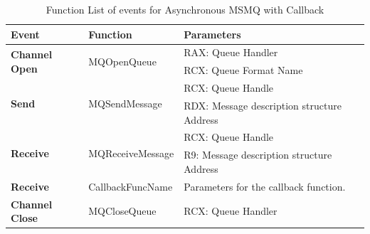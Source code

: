     \begin{table}[H]
        \centering
        \caption{Function List of events for Asynchronous MSMQ with Callback}
        \label{msmqasynfunctionscallback}
        \begin{tabular}{|l|l|l|}
            \hline
             \textbf{Event} & \textbf{Function}& \textbf{Parameters}  \\
             \hline
             \multirow{2}{*}{{\textbf{Channel Open}}}
             &\multirow{2}{*}{{MQOpenQueue}} &  RAX: Queue Handler\\
              \cline{3-3} 
             & &  RCX: Queue Format Name\\
            \hline
             \multirow{2}{*}{\textbf{Send}}
             &\multirow{2}{*}{MQSendMessage} &  RCX: Queue Handle \\
              \cline{3-3} 
             &&  RDX: Message description structure Address \\
            \hline
             \multirow{2}{*}{\textbf{Receive}}
             & \multirow{2}{*}{MQReceiveMessage}&  RCX: Queue Handle \\
              \cline{3-3} 
              &&  R9: Message description structure Address \\
             \hline
             \textbf{Receive}
              &CallbackFuncName&  Parameters for the callback function. \\
            \hline
            \textbf{Channel Close} &MQCloseQueue & RCX: Queue Handler \\
            \hline
        \end{tabular}
    \end{table}

